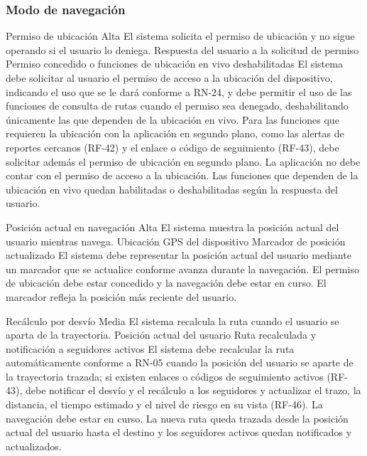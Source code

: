 \subsubsection{Modo de navegación}

  {Permiso de ubicación}%
  {Alta}%
  {El sistema solicita el permiso de ubicación y no sigue operando si el usuario lo deniega.}%
  {Respuesta del usuario a la solicitud de permiso}%
  {Permiso concedido o funciones de ubicación en vivo deshabilitadas}%
  {El sistema debe solicitar al usuario el permiso de acceso a la ubicación del dispositivo, indicando el uso que se le dará conforme a RN-24, y debe permitir el uso de las funciones de consulta de rutas cuando el permiso sea denegado, deshabilitando únicamente las que dependen de la ubicación en vivo. Para las funciones que requieren la ubicación con la aplicación en segundo plano, como las alertas de reportes cercanos (RF-42) y el enlace o código de seguimiento (RF-43), debe solicitar además el permiso de ubicación en segundo plano.}%
  {La aplicación no debe contar con el permiso de acceso a la ubicación.}%
  {Las funciones que dependen de la ubicación en vivo quedan habilitadas o deshabilitadas según la respuesta del usuario.}%

  {Posición actual en navegación}%
  {Alta}%
  {El sistema muestra la posición actual del usuario mientras navega.}%
  {Ubicación GPS del dispositivo}%
  {Marcador de posición actualizado}%
  {El sistema debe representar la posición actual del usuario mediante un marcador que se actualice conforme avanza durante la navegación.}%
  {El permiso de ubicación debe estar concedido y la navegación debe estar en curso.}%
  {El marcador refleja la posición más reciente del usuario.}%

  {Recálculo por desvío}%
  {Media}%
  {El sistema recalcula la ruta cuando el usuario se aparta de la trayectoria.}%
  {Posición actual del usuario}%
  {Ruta recalculada y notificación a seguidores activos}%
  {El sistema debe recalcular la ruta automáticamente conforme a RN-05 cuando la posición del usuario se aparte de la trayectoria trazada; si existen enlaces o códigos de seguimiento activos (RF-43), debe notificar el desvío y el recálculo a los seguidores y actualizar el trazo, la distancia, el tiempo estimado y el nivel de riesgo en su vista (RF-46).}%
  {La navegación debe estar en curso.}%
  {La nueva ruta queda trazada desde la posición actual del usuario hasta el destino y los seguidores activos quedan notificados y actualizados.}%

